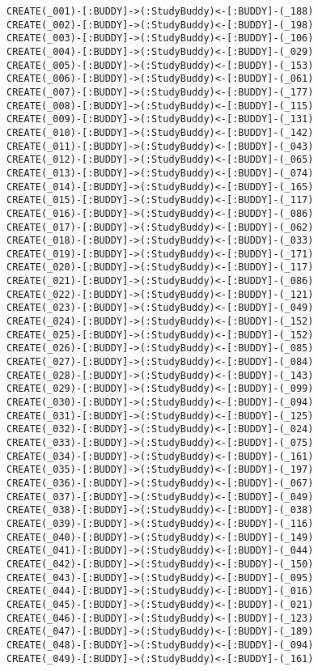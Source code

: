 \begin{lstlisting}
CREATE(_001)-[:BUDDY]->(:StudyBuddy)<-[:BUDDY]-(_188)
CREATE(_002)-[:BUDDY]->(:StudyBuddy)<-[:BUDDY]-(_198)
CREATE(_003)-[:BUDDY]->(:StudyBuddy)<-[:BUDDY]-(_106)
CREATE(_004)-[:BUDDY]->(:StudyBuddy)<-[:BUDDY]-(_029)
CREATE(_005)-[:BUDDY]->(:StudyBuddy)<-[:BUDDY]-(_153)
CREATE(_006)-[:BUDDY]->(:StudyBuddy)<-[:BUDDY]-(_061)
CREATE(_007)-[:BUDDY]->(:StudyBuddy)<-[:BUDDY]-(_177)
CREATE(_008)-[:BUDDY]->(:StudyBuddy)<-[:BUDDY]-(_115)
CREATE(_009)-[:BUDDY]->(:StudyBuddy)<-[:BUDDY]-(_131)
CREATE(_010)-[:BUDDY]->(:StudyBuddy)<-[:BUDDY]-(_142)
CREATE(_011)-[:BUDDY]->(:StudyBuddy)<-[:BUDDY]-(_043)
CREATE(_012)-[:BUDDY]->(:StudyBuddy)<-[:BUDDY]-(_065)
CREATE(_013)-[:BUDDY]->(:StudyBuddy)<-[:BUDDY]-(_074)
CREATE(_014)-[:BUDDY]->(:StudyBuddy)<-[:BUDDY]-(_165)
CREATE(_015)-[:BUDDY]->(:StudyBuddy)<-[:BUDDY]-(_117)
CREATE(_016)-[:BUDDY]->(:StudyBuddy)<-[:BUDDY]-(_086)
CREATE(_017)-[:BUDDY]->(:StudyBuddy)<-[:BUDDY]-(_062)
CREATE(_018)-[:BUDDY]->(:StudyBuddy)<-[:BUDDY]-(_033)
CREATE(_019)-[:BUDDY]->(:StudyBuddy)<-[:BUDDY]-(_171)
CREATE(_020)-[:BUDDY]->(:StudyBuddy)<-[:BUDDY]-(_117)
CREATE(_021)-[:BUDDY]->(:StudyBuddy)<-[:BUDDY]-(_086)
CREATE(_022)-[:BUDDY]->(:StudyBuddy)<-[:BUDDY]-(_121)
CREATE(_023)-[:BUDDY]->(:StudyBuddy)<-[:BUDDY]-(_049)
CREATE(_024)-[:BUDDY]->(:StudyBuddy)<-[:BUDDY]-(_152)
CREATE(_025)-[:BUDDY]->(:StudyBuddy)<-[:BUDDY]-(_152)
CREATE(_026)-[:BUDDY]->(:StudyBuddy)<-[:BUDDY]-(_085)
CREATE(_027)-[:BUDDY]->(:StudyBuddy)<-[:BUDDY]-(_084)
CREATE(_028)-[:BUDDY]->(:StudyBuddy)<-[:BUDDY]-(_143)
CREATE(_029)-[:BUDDY]->(:StudyBuddy)<-[:BUDDY]-(_099)
CREATE(_030)-[:BUDDY]->(:StudyBuddy)<-[:BUDDY]-(_094)
CREATE(_031)-[:BUDDY]->(:StudyBuddy)<-[:BUDDY]-(_125)
CREATE(_032)-[:BUDDY]->(:StudyBuddy)<-[:BUDDY]-(_024)
CREATE(_033)-[:BUDDY]->(:StudyBuddy)<-[:BUDDY]-(_075)
CREATE(_034)-[:BUDDY]->(:StudyBuddy)<-[:BUDDY]-(_161)
CREATE(_035)-[:BUDDY]->(:StudyBuddy)<-[:BUDDY]-(_197)
CREATE(_036)-[:BUDDY]->(:StudyBuddy)<-[:BUDDY]-(_067)
CREATE(_037)-[:BUDDY]->(:StudyBuddy)<-[:BUDDY]-(_049)
CREATE(_038)-[:BUDDY]->(:StudyBuddy)<-[:BUDDY]-(_038)
CREATE(_039)-[:BUDDY]->(:StudyBuddy)<-[:BUDDY]-(_116)
CREATE(_040)-[:BUDDY]->(:StudyBuddy)<-[:BUDDY]-(_149)
CREATE(_041)-[:BUDDY]->(:StudyBuddy)<-[:BUDDY]-(_044)
CREATE(_042)-[:BUDDY]->(:StudyBuddy)<-[:BUDDY]-(_150)
CREATE(_043)-[:BUDDY]->(:StudyBuddy)<-[:BUDDY]-(_095)
CREATE(_044)-[:BUDDY]->(:StudyBuddy)<-[:BUDDY]-(_016)
CREATE(_045)-[:BUDDY]->(:StudyBuddy)<-[:BUDDY]-(_021)
CREATE(_046)-[:BUDDY]->(:StudyBuddy)<-[:BUDDY]-(_123)
CREATE(_047)-[:BUDDY]->(:StudyBuddy)<-[:BUDDY]-(_189)
CREATE(_048)-[:BUDDY]->(:StudyBuddy)<-[:BUDDY]-(_094)
CREATE(_049)-[:BUDDY]->(:StudyBuddy)<-[:BUDDY]-(_161)

\end{lstlisting}
